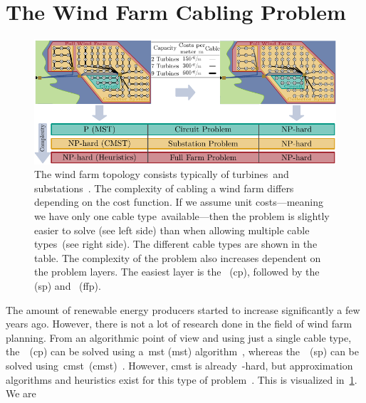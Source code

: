 \section{The Wind Farm Cabling Problem}
\label{ch:related-work:sec:wind-farm-cabling}
% 
\begin{figure}
    \includegraphics[page=1]{relatedwork/figures/windfarm-overview.pdf}
    \caption[The complexity of wind farm cabling problems.]{%
    The wind farm topology consists typically of turbines~\tikzTurbine and
    substations~\tikzSubstation. The complexity of cabling a wind farm differs
    depending on the cost function. If we assume unit costs---meaning we have
    only one cable type~\tikzOneTransportCable available---then the problem is
    slightly easier to solve (see left side) than when allowing multiple cable
    types~\tikzTransportCable (see right side). The different cable types are
    shown in the table. The complexity of the problem also increases dependent
    on the problem layers. The easiest layer is the~ (\gls{cp}),
    followed by the~ (\gls{sp}) and~
    (\gls{ffp}). }%
    \label{ch:related-work:sec:wind-farm-cabling:fig:windfarm-overview}
\end{figure}
% 
The amount of renewable energy producers started to increase significantly a few
years ago. However, there is not a lot of research done in the field of wind
farm planning. From an algorithmic point of view and using just a single cable
type, the~~(\gls{cp}) can be solved using a~\acrlong{mst}
(\gls{mst}) algorithm~\parencite{Held1971, Gabow1986}, whereas
the~~(\gls{sp}) can be solved
using~\acrlong{cmst}~(\gls{cmst})~\parencite{Vos09}. However,
\gls{cmst} is already~\NP-hard, but approximation algorithms and heuristics
exist for this type of problem~\parencite{5388449, Mar67, Vos09}. This is
visualized
in~\cref{ch:related-work:sec:wind-farm-cabling:fig:windfarm-overview}. We are
